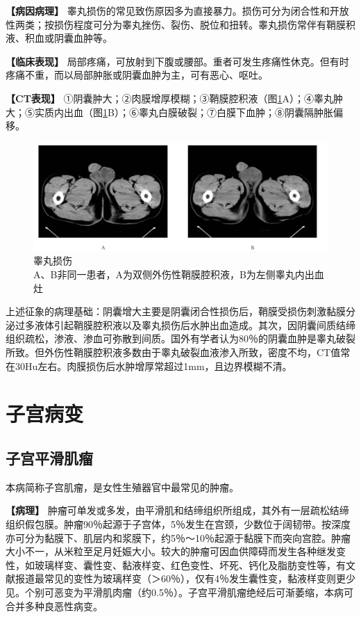 \textbf{【病因病理】}
睾丸损伤的常见致伤原因多为直接暴力。损伤可分为闭合性和开放性两类；按损伤程度可分为睾丸挫伤、裂伤、脱位和扭转。睾丸损伤常伴有鞘膜积液、积血或阴囊血肿等。

\textbf{【临床表现】}
局部疼痛，可放射到下腹或腰部。重者可发生疼痛性休克。但有时疼痛不重，而以局部肿胀或阴囊血肿为主，可有恶心、呕吐。

\textbf{【CT表现】}
①阴囊肿大；②肉膜增厚模糊；③鞘膜腔积液（图\ref{fig21-8}A）；④睾丸肿大；⑤实质内出血（图\ref{fig21-8}B）；⑥睾丸白膜破裂；⑦白膜下血肿；⑧阴囊隔肿胀偏移。

\begin{figure}[!htbp]
 \centering
 \includegraphics[width=.7\textwidth,height=\textheight,keepaspectratio]{./images/Image00404.jpg}
 \captionsetup{justification=centering}
 \caption{睾丸损伤\\{\small A、B非同一患者，A为双侧外伤性鞘膜腔积液，B为左侧睾丸内出血灶}}
 \label{fig21-8}
  \end{figure} 

上述征象的病理基础：阴囊增大主要是阴囊闭合性损伤后，鞘膜受损伤刺激黏膜分泌过多液体引起鞘膜腔积液以及睾丸损伤后水肿出血造成。其次，因阴囊间质结缔组织疏松，渗液、渗血可弥散到间质。国外有学者认为80％的阴囊血肿是睾丸破裂所致。但外伤性鞘膜腔积液多数由于睾丸破裂血液渗入所致，密度不均，CT值常在30Hu左右。肉膜损伤后水肿增厚常超过1mm，且边界模糊不清。

\section{子宫病变}

\subsection{子宫平滑肌瘤}

本病简称子宫肌瘤，是女性生殖器官中最常见的肿瘤。

\textbf{【病理】}
肿瘤可单发或多发，由平滑肌和结缔组织所组成，其外有一层疏松结缔组织假包膜。肿瘤90％起源于子宫体，5％发生在宫颈，少数位于阔韧带。按深度亦可分为黏膜下、肌层内和浆膜下，约5％～10％起源于黏膜下而突向宫腔。肿瘤大小不一，从米粒至足月妊娠大小。较大的肿瘤可因血供障碍而发生各种继发变性，如玻璃样变、囊性变、黏液样变、红色变性、坏死、钙化及脂肪变性等，有文献报道最常见的变性为玻璃样变（＞60％），仅有4％发生囊性变，黏液样变则更少见。个别可恶变为平滑肌肉瘤（约0.5％）。子宫平滑肌瘤绝经后可渐萎缩，本病可合并多种良恶性病变。

